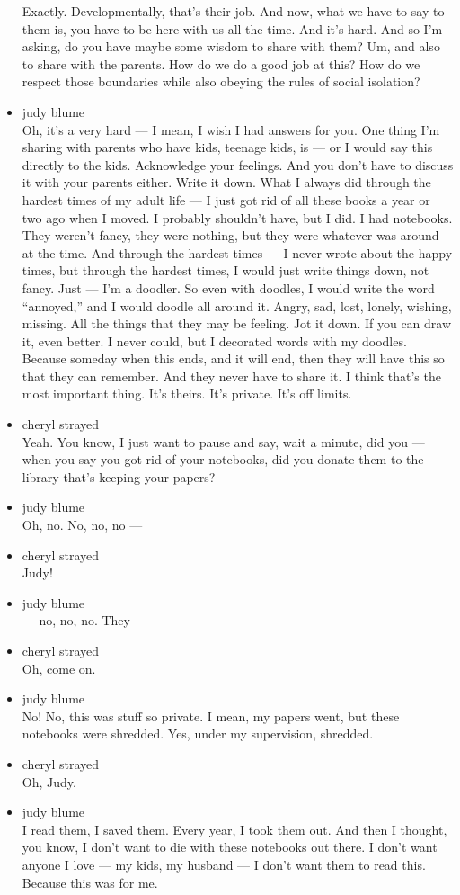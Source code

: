 \begin{itemize}
  Exactly. Developmentally, that's their job. And now, what we have to
  say to them is, you have to be here with us all the time. And it's
  hard. And so I'm asking, do you have maybe some wisdom to share with
  them? Um, and also to share with the parents. How do we do a good job
  at this? How do we respect those boundaries while also obeying the
  rules of social isolation?
\item
  judy blume\\
  Oh, it's a very hard --- I mean, I wish I had answers for you. One
  thing I'm sharing with parents who have kids, teenage kids, is --- or
  I would say this directly to the kids. Acknowledge your feelings. And
  you don't have to discuss it with your parents either. Write it down.
  What I always did through the hardest times of my adult life --- I
  just got rid of all these books a year or two ago when I moved. I
  probably shouldn't have, but I did. I had notebooks. They weren't
  fancy, they were nothing, but they were whatever was around at the
  time. And through the hardest times --- I never wrote about the happy
  times, but through the hardest times, I would just write things down,
  not fancy. Just --- I'm a doodler. So even with doodles, I would write
  the word ``annoyed,'' and I would doodle all around it. Angry, sad,
  lost, lonely, wishing, missing. All the things that they may be
  feeling. Jot it down. If you can draw it, even better. I never could,
  but I decorated words with my doodles. Because someday when this ends,
  and it will end, then they will have this so that they can remember.
  And they never have to share it. I think that's the most important
  thing. It's theirs. It's private. It's off limits.
\item
  cheryl strayed\\
  Yeah. You know, I just want to pause and say, wait a minute, did you
  --- when you say you got rid of your notebooks, did you donate them to
  the library that's keeping your papers?
\item
  judy blume\\
  Oh, no. No, no, no ---
\item
  cheryl strayed\\
  Judy!
\item
  judy blume\\
  --- no, no, no. They ---
\item
  cheryl strayed\\
  Oh, come on.
\item
  judy blume\\
  No! No, this was stuff so private. I mean, my papers went, but these
  notebooks were shredded. Yes, under my supervision, shredded.
\item
  cheryl strayed\\
  Oh, Judy.
\item
  judy blume\\
  I read them, I saved them. Every year, I took them out. And then I
  thought, you know, I don't want to die with these notebooks out there.
  I don't want anyone I love --- my kids, my husband --- I don't want
  them to read this. Because this was for me.


\end{itemize}
